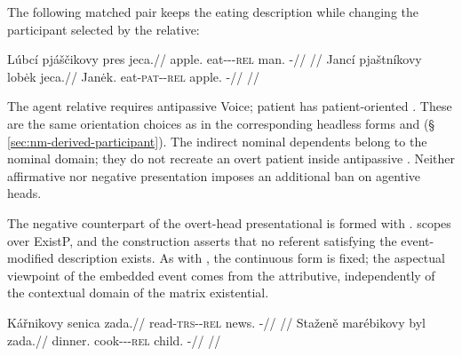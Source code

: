 The following matched pair keeps the eating description while changing the
participant selected by the relative:

\pex
\a
\begingl
\gla Lúbcí pjáščikovy pres jeca.//
\glb apple.\Ind{} eat-\Antip{}-\Pf{}-\textsc{rel} man.\Dir{} \Exst{}-\Cont{}//
\glft {} //
\endgl
\a
\begingl
\gla Jancí pjaštníkovy lobėk jeca.//
\glb Janėk.\Ind{} eat-\textsc{pat}-\Pf{}-\textsc{rel} apple.\Dir{} \Exst{}-\Cont{}//
\glft {} //
\endgl
\xe

The agent relative  requires antipassive Voice; patient
 has patient-oriented . These are the same
orientation choices as in the corresponding headless forms 
and  (§\,\ref{sec:nm-derived-participant}). The indirect
nominal dependents belong to the nominal domain; they do not recreate an
overt patient inside antipassive . Neither affirmative nor
negative presentation imposes an additional ban on agentive heads.

The negative counterpart of the overt-head presentational is formed with
.  scopes over ExistP, and the construction asserts that
no referent satisfying the event-modified description exists. As with
, the continuous form  is fixed; the aspectual
viewpoint of the embedded event comes from the attributive, independently of
the contextual domain of the matrix existential.

\pex
\a
\begingl
\gla Kářnikovy senica zada.//
\glb read-\textsc{trs}-\Pf{}-\textsc{rel} news.\Dir{} \NegExst{}-\Cont{}//
\glft {} //
\endgl
\a
\begingl
\gla Staženě marébikovy byl zada.//
\glb dinner.\Ind{} cook-\Appl{}-\Pf{}-\textsc{rel} child.\Dir{} \NegExst{}-\Cont{}//
\glft {} //
\endgl
\xe

